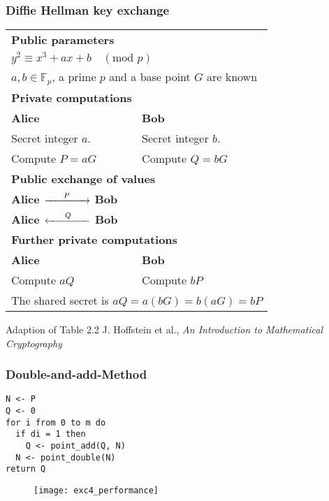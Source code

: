 \documentclass{beamer}
\begin{document}
  \begin{frame}[shrink=20]
  \frametitle{Diffie Hellman key exchange}
  \begin{table}
  \begin{tabular}{|p{5cm} p{5cm} |}
      \hline			
      \multicolumn{2}{|p{10cm}|}{\rule{0em}{1.2em}\bf{Public parameters}}\\
      \multicolumn{2}{|p{10cm}|}{$ y^2 \equiv x^3 + ax + b \quad (\text{mod } p)$}\\
      \multicolumn{2}{|p{10cm}|}{$a,b \in \mathbb{F}_p$, a prime $p$ and a base point $G$ are known}\\
      \hline
      \multicolumn{2}{|p{10cm}|}{\rule{0em}{1.2em}\bf{Private computations}}\\
      \bf{\small{Alice}} & \bf{\small{Bob}}\\
      Secret integer $a$. & Secret integer $b$.\\
      Compute $P = aG$ &  Compute $Q = bG$ \\
      \hline
      \multicolumn{2}{|p{10cm}|}{\rule{0em}{1.2em}\bf{Public exchange of values}}\\
      \multicolumn{2}{|p{10cm}|}{
      \bf{\small{Alice}} $\xrightarrow{\hspace*{0.6cm}P\hspace*{0.6cm}}$ \bf{\small{Bob}}
      } \\
      \multicolumn{2}{|p{10cm}|}{
      \bf{\small{Alice}} $\xleftarrow{\hspace*{0.6cm}Q\hspace*{0.6cm}}$ \bf{\small{Bob}}
      }\\
      \hline
      \multicolumn{2}{|p{10cm}|}{\rule{0em}{1.2em}\bf{Further private computations}}\\
      \bf{\small{Alice}} & \bf{\small{Bob}}\\
      Compute $aQ$ & Compute $bP$ \\
      \multicolumn{2}{|p{10cm}|}{
      The shared secret is $aQ = a(bG) = b(aG) = bP$}\\ \hline
    \end{tabular}
    \end{table}
    \vfill
    \tiny{Adaption of Table 2.2 J. Hoffstein et al., \emph{An Introduction to Mathematical Cryptography}}
\end{frame}
\begin{frame}[fragile]
\frametitle{Double-and-add-Method}
\begin{lstlisting}[frame=single]  % Start your code-block
N <- P
Q <- 0
for i from 0 to m do
  if di = 1 then
    Q <- point_add(Q, N)
  N <- point_double(N)
return Q
\end{lstlisting}
\end{frame}
\begin{frame}
\begin{figure}\flushleft
\texttt{[image: exc4\_performance]}
\end{figure}

\end{frame}
\end{document}
